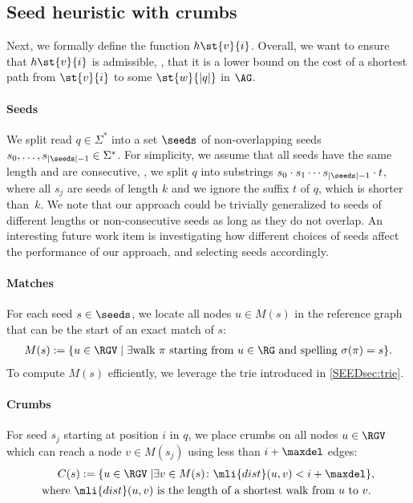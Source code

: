 \subsection{Seed heuristic with crumbs} \label{SEEDsec:definition}
%
Next, we formally define the \sh function $h\st{v}{i}$. Overall, we want to
ensure that $h\st{v}{i}$ is admissible, \ie, that it is a lower bound on the
cost of a shortest path from $\st{v}{i}$ to some $\st{w}{|q|}$ in $\AG$.

\paragraph{Seeds}
%
We split read $q \in \Sigma^*$ into a set $\seeds$ of non-overlapping seeds
$s_0, \dots, s_{|\seeds|-1} \in \Sigma^*$.
%
For simplicity, we assume that all seeds have the same length and are
consecutive, \ie, we split $q$ into substrings $s_0 \cdot s_1 \cdots
s_{|\seeds|-1} \cdot t$, where all $s_j$ are seeds of length $k$ and we ignore
the suffix $t$ of $q$, which is shorter than~$k$.
%
We note that our approach could be trivially generalized to seeds of different
lengths or non-consecutive seeds as long as they do not overlap. An interesting
future work item is investigating how different choices of seeds affect the
performance of our approach, and selecting seeds accordingly.

\paragraph{Matches}
%
For each seed $s \in \seeds$, we locate all nodes $u \in M(s)$ in the reference
graph that can be the start of an exact match of $s$:
%
\begin{align*}
	M(s) := \{u \in \RGV \mid \exists \text{walk } \pi \text{ starting from } u \in \RG \text{ and spelling } \sigma(\pi) = s \}.
\end{align*}
%
To compute $M(s)$ efficiently, we leverage the trie introduced in
\cref{SEEDsec:trie}.

\paragraph{Crumbs}
For seed $s_j$ starting at position $i$ in $q$, we place crumbs on all nodes $u
\in \RGV$ which can reach a node $v \in M(s_j)$ using less than $i+\maxdel$
edges:
%
\begin{align*}
	C(s) := \{u \in \RGV \mid & \exists v \in M(s)\colon \mli{dist}(u, v) < i + \maxdel \},\\
	\text{where }\mli{dist}(u, v) &\text{ is the length of a shortest walk from } u \text{ to } v.
\end{align*}

